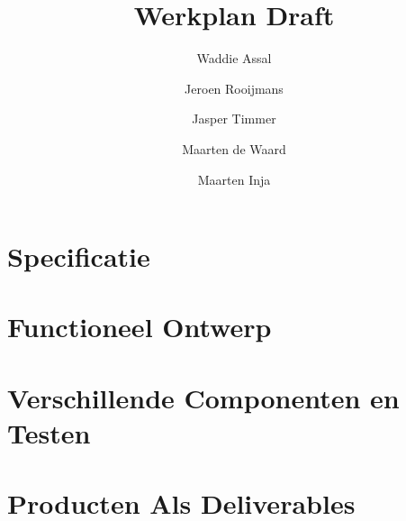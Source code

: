 \documentclass[a4paper, notitlepage]{article}
\title{Werkplan Draft}
\author{Waddie Assal \and Jeroen Rooijmans \and Jasper Timmer \and Maarten de Waard \and Maarten Inja}
\begin{document}
\maketitle

\section{Specificatie}

\section{Functioneel Ontwerp}

\section{Verschillende Componenten en Testen}

\section{Producten Als Deliverables}
\end{document}

